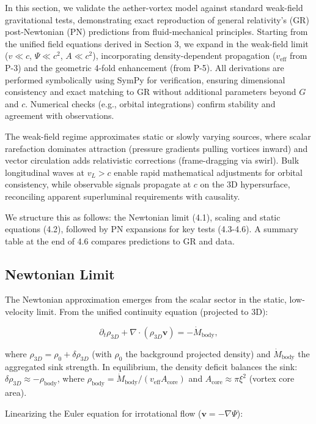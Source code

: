 \documentclass{article}
\begin{document}
In this section, we validate the aether-vortex model against standard weak-field gravitational tests, demonstrating exact reproduction of general relativity's (GR) post-Newtonian (PN) predictions from fluid-mechanical principles. Starting from the unified field equations derived in Section 3, we expand in the weak-field limit ($v \ll c$, $\Psi \ll c^2$, $A \ll c^2$), incorporating density-dependent propagation ($v_{\text{eff}}$ from P-3) and the geometric 4-fold enhancement (from P-5). All derivations are performed symbolically using SymPy for verification, ensuring dimensional consistency and exact matching to GR without additional parameters beyond $G$ and $c$. Numerical checks (e.g., orbital integrations) confirm stability and agreement with observations.

The weak-field regime approximates static or slowly varying sources, where scalar rarefaction dominates attraction (pressure gradients pulling vortices inward) and vector circulation adds relativistic corrections (frame-dragging via swirl). Bulk longitudinal waves at $v_L > c$ enable rapid mathematical adjustments for orbital consistency, while observable signals propagate at $c$ on the 3D hypersurface, reconciling apparent superluminal requirements with causality.

We structure this as follows: the Newtonian limit (4.1), scaling and static equations (4.2), followed by PN expansions for key tests (4.3-4.6). A summary table at the end of 4.6 compares predictions to GR and data.

\subsection{Newtonian Limit}

The Newtonian approximation emerges from the scalar sector in the static, low-velocity limit. From the unified continuity equation (projected to 3D):

\[
\partial_t \rho_{3D} + \nabla \cdot (\rho_{3D} \mathbf{v}) = -\dot{M}_{\text{body}},
\]

where $\rho_{3D} = \rho_0 + \delta \rho_{3D}$ (with $\rho_0$ the background projected density) and $\dot{M}_{\text{body}}$ the aggregated sink strength. In equilibrium, the density deficit balances the sink: $\delta \rho_{3D} \approx -\rho_{\text{body}}$, where $\rho_{\text{body}} = \dot{M}_{\text{body}} / (v_{\text{eff}} A_{\text{core}})$ and $A_{\text{core}} \approx \pi \xi^2$ (vortex core area).

Linearizing the Euler equation for irrotational flow ($\mathbf{v} = -\nabla \Psi$):
\end{document}
